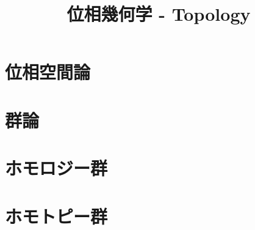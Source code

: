 \documentclass[a4paper]{jsreport}
\title{位相幾何学 - Topology}
\begin{document}
    \maketitle

    \tableofcontents

    \chapter{位相空間論}

    \chapter{群論}

    \chapter{ホモロジー群}

    \chapter{ホモトピー群}
\end{document}

